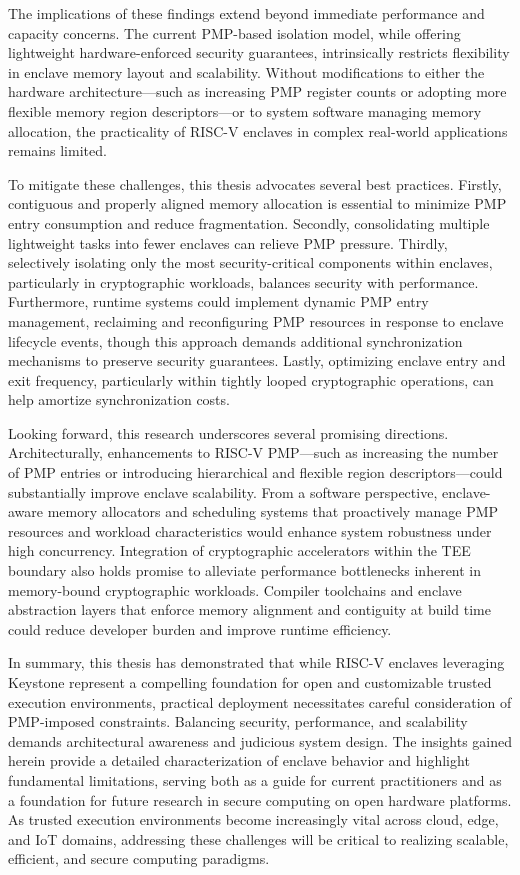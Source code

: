The implications of these findings extend beyond immediate performance and capacity concerns. The current PMP-based isolation model, while offering lightweight hardware-enforced security guarantees, intrinsically restricts flexibility in enclave memory layout and scalability. Without modifications to either the hardware architecture—such as increasing PMP register counts or adopting more flexible memory region descriptors—or to system software managing memory allocation, the practicality of RISC-V enclaves in complex real-world applications remains limited.

To mitigate these challenges, this thesis advocates several best practices. Firstly, contiguous and properly aligned memory allocation is essential to minimize PMP entry consumption and reduce fragmentation. Secondly, consolidating multiple lightweight tasks into fewer enclaves can relieve PMP pressure. Thirdly, selectively isolating only the most security-critical components within enclaves, particularly in cryptographic workloads, balances security with performance. Furthermore, runtime systems could implement dynamic PMP entry management, reclaiming and reconfiguring PMP resources in response to enclave lifecycle events, though this approach demands additional synchronization mechanisms to preserve security guarantees. Lastly, optimizing enclave entry and exit frequency, particularly within tightly looped cryptographic operations, can help amortize synchronization costs.

Looking forward, this research underscores several promising directions. Architecturally, enhancements to RISC-V PMP—such as increasing the number of PMP entries or introducing hierarchical and flexible region descriptors—could substantially improve enclave scalability. From a software perspective, enclave-aware memory allocators and scheduling systems that proactively manage PMP resources and workload characteristics would enhance system robustness under high concurrency. Integration of cryptographic accelerators within the TEE boundary also holds promise to alleviate performance bottlenecks inherent in memory-bound cryptographic workloads. Compiler toolchains and enclave abstraction layers that enforce memory alignment and contiguity at build time could reduce developer burden and improve runtime efficiency.

In summary, this thesis has demonstrated that while RISC-V enclaves leveraging Keystone represent a compelling foundation for open and customizable trusted execution environments, practical deployment necessitates careful consideration of PMP-imposed constraints. Balancing security, performance, and scalability demands architectural awareness and judicious system design. The insights gained herein provide a detailed characterization of enclave behavior and highlight fundamental limitations, serving both as a guide for current practitioners and as a foundation for future research in secure computing on open hardware platforms. As trusted execution environments become increasingly vital across cloud, edge, and IoT domains, addressing these challenges will be critical to realizing scalable, efficient, and secure computing paradigms.

